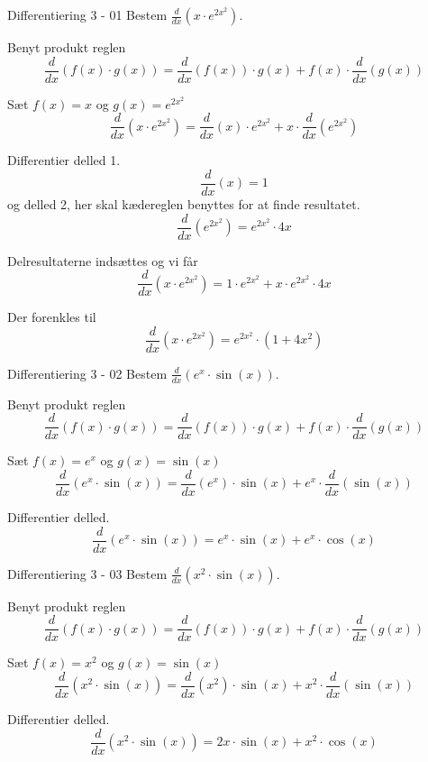 \documentclass{article}
\begin{document}
\tableofcontents
\newpage

\begin{exercise}{Differentiering 3 - 01}
Bestem $\frac{d}{dx} \left( x \cdot e^{2x^2} \right)$.


\hint
Benyt produkt reglen
\[
\frac{d}{dx} \left( f(x) \cdot g(x) \right) = \frac{d}{dx} \left( f(x) \right) \cdot g(x) + f(x) \cdot \frac{d}{dx} \left( g(x) \right)
\]

\hint
Sæt $f(x) = x$ og $g(x) = e^{2x^2}$
\[
\frac{d}{dx} \left( x \cdot e^{2x^2} \right) = \frac{d}{dx} \left( x \right) \cdot e^{2x^2} + x \cdot \frac{d}{dx} \left( e^{2x^2} \right)
\]

\hint
Differentier delled 1.
\[
\frac{d}{dx} \left( x \right) = 1
\]
og delled 2, her skal kædereglen benyttes for at finde resultatet.
\[
\frac{d}{dx} \left( e^{2x^2} \right) = e^{2x^2} \cdot 4x
\]


\hint
Delresultaterne indsættes og vi får
\[
\frac{d}{dx} \left( x \cdot e^{2x^2} \right) = 1 \cdot e^{2x^2} + x \cdot e^{2x^2} \cdot 4x
\]

\hint
Der forenkles til 
\[
\frac{d}{dx} \left( x \cdot e^{2x^2} \right) = e^{2x^2} \cdot (1 + 4x^2) 
\]

\end{exercise}


\begin{exercise}{Differentiering 3 - 02}
Bestem $\frac{d}{dx} \left( e^x \cdot \sin(x) \right)$.


\hint
Benyt produkt reglen
\[
\frac{d}{dx} \left( f(x) \cdot g(x) \right) = \frac{d}{dx} \left( f(x) \right) \cdot g(x) + f(x) \cdot \frac{d}{dx} \left( g(x) \right)
\]

\hint
Sæt $f(x) = e^x$ og $g(x) = \sin(x)$
\[
\frac{d}{dx} \left( e^x \cdot \sin(x) \right) = \frac{d}{dx} \left( e^x \right) \cdot \sin(x) + e^x \cdot \frac{d}{dx} \left( \sin(x) \right)
\]

\hint
Differentier delled.
\[
\frac{d}{dx} \left( e^x \cdot \sin(x) \right) = e^x \cdot \sin(x) + e^x \cdot \cos(x)
\]
\end{exercise}


\begin{exercise}{Differentiering 3 - 03}
	Bestem $\frac{d}{dx} \left( x^2 \cdot \sin(x) \right)$.
	
	
	\hint
	Benyt produkt reglen
	\[
	\frac{d}{dx} \left( f(x) \cdot g(x) \right) = \frac{d}{dx} \left( f(x) \right) \cdot g(x) + f(x) \cdot \frac{d}{dx} \left( g(x) \right)
	\]
	
	\hint
	Sæt $f(x) = x^2$ og $g(x) = \sin(x)$
	\[
	\frac{d}{dx} \left( x^2 \cdot \sin(x) \right) = \frac{d}{dx} \left( x^2 \right) \cdot \sin(x) + x^2 \cdot \frac{d}{dx} \left( \sin(x) \right)
	\]
	
	\hint
	Differentier delled.
	\[
	\frac{d}{dx} \left( x^2 \cdot \sin(x) \right) = 2x \cdot \sin(x) + x^2 \cdot \cos(x)
	\]
\end{exercise}
\end{document}
